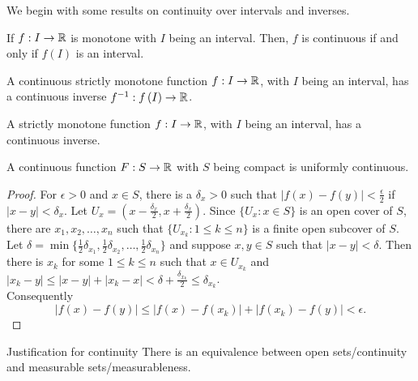 We begin with some results on continuity over intervals and inverses.
\begin{recall}
	If \(f : I \to \mathbb{R}\)  is monotone with \(I\) being an interval. Then, \(f\) is continuous if and only if \(f\left( I \right) \) is an interval.
\end{recall}
\begin{corollary}
	A continuous strictly monotone function \(f: I \to \mathbb{R}\), with \(I\) being an interval, has a continuous inverse \(f^{-1}: f\left( I \right) \to \mathbb{R}\).
\end{corollary}
\begin{proposition}
	A strictly monotone function \(f: I \to \mathbb{R}\), with \(I\) being an interval, has a continuous inverse.
\end{proposition}
\begin{theorem}
	A continuous function \(F : S\to \mathbb{R}\) with \(S\) being compact is uniformly continuous.
\end{theorem}
\begin{proof}
	For \(\epsilon > 0\) and \(x \in S\), there is a \(\delta_{x} > 0\) such that \(\left| f\left( x \right) - f\left( y \right)  \right| < \frac{\epsilon}{2}\) if \(\left| x-y \right|  < \delta_{x}\). Let \(U_{x} = \left( x - \frac{\delta_{x}}{2}, x+ \frac{\delta_{x}}{2} \right) \). Since \(\{U_{x} : x \in S\} \) is an open cover of \(S\), there are \(x_1, x_2, \ldots, x_{n}\) such that \(\{U_{x_{k}} : 1\le k \le n\} \) is a finite open subcover of \(S.\) Let \(\delta = \min \{\frac{1}{2}\delta_{x_1}, \frac{1}{2}\delta_{x_2}, \ldots, \frac{1}{2}\delta_{x_{n}}\} \) and suppose \(x, y \in S\) such that \(\left| x- y \right| < \delta\). Then there is \(x_{k}\) for some \(1 \le k \le n\) such that \(x \in U_{x_{k}}\) and \(\left| x_{k} - y \right| \le \left| x-y \right| + \left| x_{k} - x \right|  < \delta + \frac{\delta_{x_{k}}}{2} \le \delta_{x_{k}}\).\\
	Consequently
	\[
		\left| f\left( x \right)  - f\left( y \right)  \right| \le   \left| f\left( x \right)  - f\left( x_{k} \right)   \right| + \left| f\left( x_{k} \right) - f\left( y \right)    \right| < \epsilon  .
	\]
\end{proof}
\begin{note}{Justification for continuity}
	There is an equivalence between open sets/continuity and measurable sets/measurableness.
\end{note}
